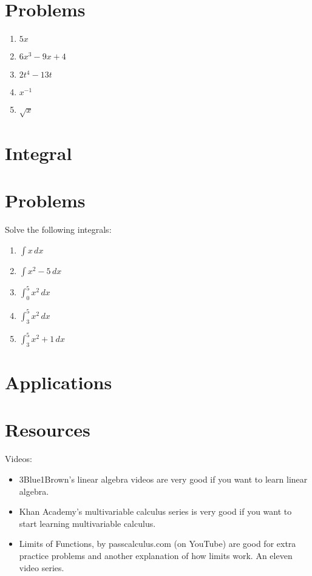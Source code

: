 \documentclass[12pt]{article}
\begin{document}
\section{Problems}
\begin{enumerate}
    \item $5x$
    \item $6x^3 - 9x + 4$
    \item $2t^4 - 13t$
    \item $x^{-1}$
    \item $\sqrt{x}$
\end{enumerate}

\section{Integral}



\section{Problems}
Solve the following integrals:

\begin{enumerate}
    \item $\int x \, dx$
    \item $\int x^2-5 \, dx$
    \item $\int^5_0 x^2 \, dx$
    \item $\int^5_3 x^2 \, dx$
    \item $\int^5_3 x^2 + 1 \, dx$
\end{enumerate}

\section{Applications}



\section{Resources}

Videos:
\begin{itemize}
\item 3Blue1Brown's linear algebra videos are very good if you want to learn linear algebra.
\item Khan Academy's multivariable calculus series is very good if you want to start learning multivariable calculus.
\item Limits of Functions, by passcalculus.com (on YouTube) are good for extra practice problems and another explanation of how limits work. An eleven video series.
\end{itemize}
\end{document}
